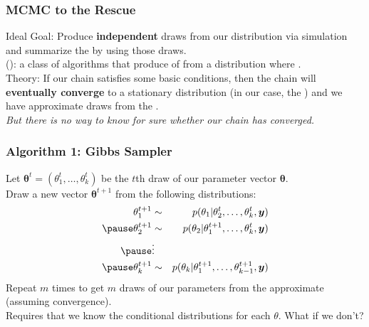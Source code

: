 \documentclass[handout]{beamer}
\begin{document}
\begin{frame}
\frametitle{MCMC to the Rescue}
\pause
Ideal Goal: \pause Produce {\bf independent} draws from our 
distribution via simulation and summarize the  by using those
draws. \\
\pause
\bigskip
{}  (): a
class of algorithms that produce  of  from a distribution
where . \\
\pause
\bigskip
Theory: \pause If our chain satisfies some basic conditions, then the chain
will {\bf eventually converge} to a stationary distribution (in our case, the
) \pause and we have approximate draws from the
.\\
\pause
\bigskip
{\it But there is no way to know for sure whether our chain has converged.}
\end{frame}

\begin{frame}
\frametitle{Algorithm 1: Gibbs Sampler}
\pause
Let $\bm{\theta}^t = (\theta_1^t, \dots, \theta_k^t)$ be the $t$th
draw of our parameter vector $\bm{\theta}$.\\
\pause
\bigskip
Draw a new vector $\bm{\theta}^{t+1}$ from the following distributions:
\pause
\begin{eqnarray*}
\theta_1^{t+1} &\sim& p(\theta_1 | \theta_2^t, \dots, \theta_k^t,
\bm{y}) \\
\pause
\theta_2^{t+1} &\sim& p(\theta_2 | \theta_1^{t+1}, \dots, \theta_k^t,
\bm{y}) \\
\pause
&\vdots&\\
\pause
\theta_k^{t+1} &\sim& p(\theta_k | \theta_1^{t+1}, \dots, \theta_{k-1}^{t+1},\bm{y}) \\
\end{eqnarray*}
\pause
Repeat $m$ times to get $m$ draws of our parameters from the
approximate  (assuming convergence). \\
\pause
\bigskip
Requires that we know the conditional distributions for each
$\theta$.  \pause What if we don't?
\end{frame}
\end{document}

